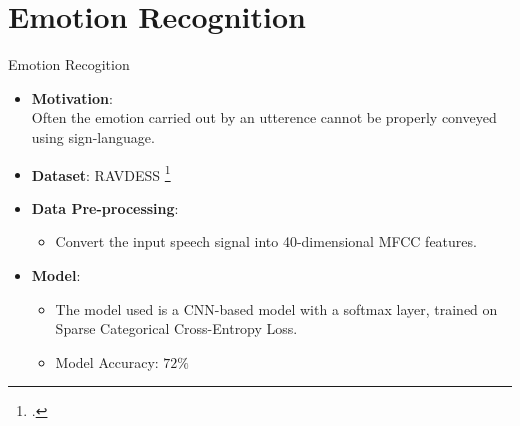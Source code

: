 \documentclass[10pt]{beamer}
\begin{document}
\section{Emotion Recognition}
\begin{frame}{Emotion Recogition}
\begin{itemize}
	\item \textbf{Motivation}:\\
	Often the emotion carried out by an utterence cannot be properly conveyed using sign-language.
	\item \textbf{Dataset}: RAVDESS \footcite{ravdess}
	\item \textbf{Data Pre-processing}:
	\begin{itemize}
		\item Convert the input speech signal into 40-dimensional MFCC features.
	\end{itemize}
	\item \textbf{Model}:
	\begin{itemize}
		\item The model used is a CNN-based model with a softmax layer, trained on Sparse Categorical Cross-Entropy Loss.
		\item Model Accuracy: $72\%$		
	\end{itemize}
\end{itemize}
\end{frame}
\end{document}
